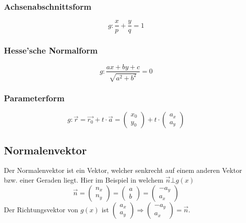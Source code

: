 \subsubsection{Achsenabschnittsform}
\[ \boxed{ g: \frac{x}{p} + \frac{y}{q} = 1 } \]

\subsubsection{Hesse'sche Normalform}
\[ \boxed{ g:  \frac{ax + by + c}{\sqrt{ a^2 + b^2 } } = 0 }  \]

\subsubsection{Parameterform}
\[ \boxed{ 
	g: \vec{r} = \vec{r_0} + t \cdot \vec{a}  = 
    \left( 
		\begin{array}{cc} 
	  		x_0 \\ y_0
		\end{array}
	\right)
    + t \cdot 
    \left( 
		\begin{array}{cc} 
			a_x \\ a_y
		\end{array}
    \right)  
   }
\]


\subsection{Normalenvektor}
Der Normalenvektor ist ein Vektor, welcher senkrecht auf einem anderen Vektor bzw. einer Geraden liegt. Hier im Beispiel in welchem $ \vec{n} \bot g(x)$
\[ \boxed{ \vec{n} = 
	\left( 
		\begin{array}{cc} 
	  		n_x \\ n_y
		\end{array}
    \right)
    =
    \left( 
		\begin{array}{cc} 
			a \\ b
		\end{array}
    \right)
    =
    \left( 
		\begin{array}{cc} 
			-a_y \\ a_x
		\end{array}
    \right)
} \]
\noindent
Der Richtungsvektor von $g(x)$ ist 
$  
	\left( 
		\begin{array}{cc} 
	  		a_x \\ a_y
		\end{array}
    \right)
    \Rightarrow 
    \left( 
		\begin{array}{cc} 
	  		-a_y \\ a_x
		\end{array}
    \right)
    = \vec{n}
$.

